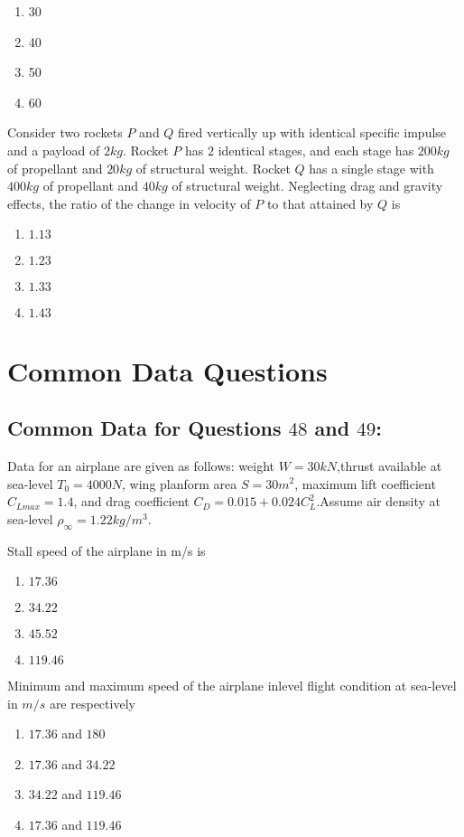 	\begin{enumerate}
	\item 30 \item 40 \item 50 \item 60
	\end{enumerate}
\item Consider two rockets $P$ and $Q$ fired vertically up with identical specific impulse and a payload of $2 kg$. Rocket $P$ has $2$ identical stages, and each stage has $200 kg$ of propellant and $20 kg$ of structural weight. Rocket $Q$ has a single stage with $400 kg$ of propellant and $40 kg$ of structural weight. Neglecting drag and gravity effects, the ratio of the change in velocity of $P$ to that attained by $Q$ is 
	\begin{enumerate}
\item $1.13$ \item $1.23$ \item $1.33$ \item $1.43$
	\end{enumerate}
	\section*{Common Data Questions}
	\subsection*{Common Data for Questions $48$ and $49$:}Data for an airplane are given as follows: weight $W=30kN$,thrust available at sea-level $T_0=4000 N$, wing planform area $S=30 m^2$, maximum lift coefficient $C_{Lmax}=1.4$, and drag coefficient $C_D=0.015+0.024 C_L^2$.Assume air density at sea-level $\rho_{\infty} = 1.22 kg/m^3.$\\
\item Stall speed of the airplane in m/s is
	\begin{enumerate}
		\item $17.36$ \item $34.22$ 
		\item $45.52$ \item $119.46$
	\end{enumerate}
\item Minimum and maximum speed of the airplane inlevel flight condition at sea-level in $m/s$ are respectively
	\begin{enumerate}
		\item $17.36$ and $180$
		\item $17.36$ and $34.22$
		\item $34.22$ and $119.46$
		\item $17.36$ and $119.46$
	\end{enumerate}
